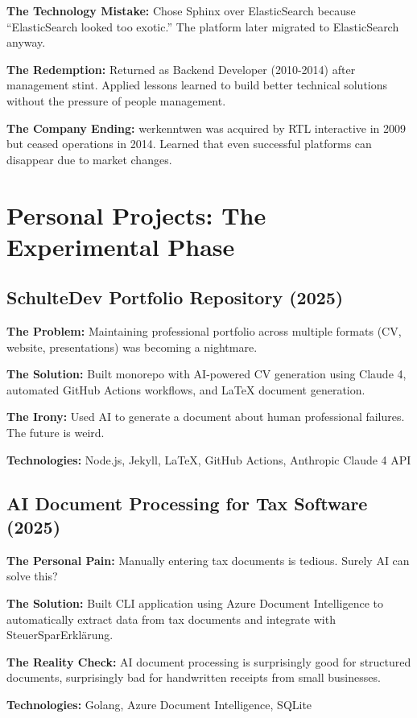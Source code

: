 \documentclass[11pt,a4paper]{article}
\begin{document}
\textbf{The Technology Mistake:} Chose Sphinx over ElasticSearch because ``ElasticSearch looked too exotic.'' The platform later migrated to ElasticSearch anyway.

\textbf{The Redemption:} Returned as Backend Developer (2010-2014) after management stint. Applied lessons learned to build better technical solutions without the pressure of people management.

\textbf{The Company Ending:} werkenntwen was acquired by RTL interactive in 2009 but ceased operations in 2014. Learned that even successful platforms can disappear due to market changes.

\section{Personal Projects: The Experimental Phase}

\subsection{SchulteDev Portfolio Repository (2025)}
\textbf{The Problem:} Maintaining professional portfolio across multiple formats (CV, website, presentations) was becoming a nightmare.

\textbf{The Solution:} Built monorepo with AI-powered CV generation using Claude 4, automated GitHub Actions workflows, and LaTeX document generation.

\textbf{The Irony:} Used AI to generate a document about human professional failures. The future is weird.

\textbf{Technologies:} Node.js, Jekyll, LaTeX, GitHub Actions, Anthropic Claude 4 API

\subsection{AI Document Processing for Tax Software (2025)}
\textbf{The Personal Pain:} Manually entering tax documents is tedious. Surely AI can solve this?

\textbf{The Solution:} Built CLI application using Azure Document Intelligence to automatically extract data from tax documents and integrate with SteuerSparErklärung.

\textbf{The Reality Check:} AI document processing is surprisingly good for structured documents, surprisingly bad for handwritten receipts from small businesses.

\textbf{Technologies:} Golang, Azure Document Intelligence, SQLite
\end{document}

